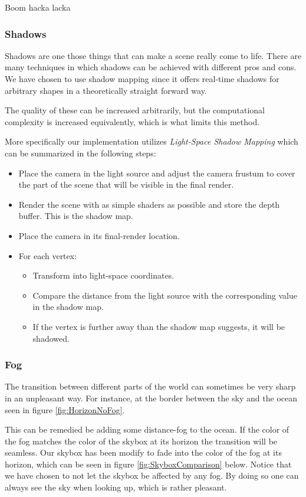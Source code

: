 Boom hacka lacka

\subsubsection{Shadows}
Shadows are one those things that can make a scene really come to life. There are many techniques in which shadows can be achieved with different pros and cons. We have chosen to use shadow mapping since it offers real-time shadows for arbitrary shapes in a theoretically straight forward way. 

The quality of these can be increased arbitrarily, but the computational complexity is increased equivalently, which is what limits this method. 

More specifically our implementation utilizes \textit{Light-Space Shadow Mapping} which can be summarized in the following steps:

\begin{itemize}
\item Place the camera in the light source and adjust the camera frustum to cover the part of the scene that will be visible in the final render.
\item Render the scene with as simple shaders as possible and store the depth buffer. This is the shadow map.
\item Place the camera in its final-render location.
\item For each vertex:
\begin{itemize}
\item Transform into light-space coordinates.
\item Compare the distance from the light source with the corresponding value in the shadow map.
\item If the vertex is further away than the shadow map suggests, it will be shadowed. 
\end{itemize}
\end{itemize}



\subsubsection{Fog}
The transition between different parts of the world can sometimes be very sharp in an unpleasant way. For instance, at the border between the sky and the ocean seen in figure \ref{fig:HorizonNoFog}. 

This can be remedied be adding some distance-fog to the ocean. If the color of the fog matches the color of the skybox at its horizon the transition will be seamless. Our skybox has been modify to fade into the color of the fog at its horizon, which can be seen in figure \ref{fig:SkyboxComparison} below. Notice that we have chosen to not let the skybox be affected by any fog. By doing so one can always see the sky when looking up, which is rather pleasant. 

